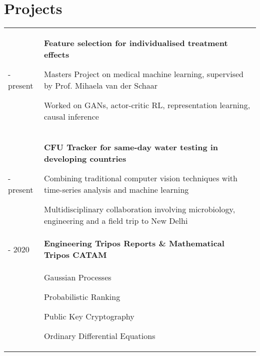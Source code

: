 \documentclass[letterpaper, 10pt]{article}
\begin{document}
\section*{Projects}
\begin{tabularx}{\linewidth}{>{\raggedleft}p{2.2cm}|X X}
2019 - present & \multicolumn{2}{p{\linegoal}}{
    \vspace{-2.9mm}\textbf{Feature selection for individualised treatment effects}
    \begin{compact}
        \item Masters Project on medical machine learning, supervised by Prof. Mihaela van der Schaar
        \item Worked on GANs, actor-critic RL, representation learning, causal inference
        \vspace{-.5\baselineskip}
    \end{compact}
}\\
2017 - present & \multicolumn{2}{p{\linegoal}}{
	\vspace{-2.9mm}\textbf{CFU Tracker for same-day water testing in developing countries}
	\begin{compact}
		\item Combining traditional computer vision techniques with time-series analysis and machine learning
		\item Multidisciplinary collaboration involving microbiology, engineering and a field trip to New Delhi
		\vspace{-.5\baselineskip}
	\end{compact}
}\\
2016 - 2020 & \multicolumn{2}{l}{\textbf{Engineering Tripos Reports \& Mathematical Tripos CATAM}}\\&
\begin{compact}
	\vspace{-.5\baselineskip}
    \item Gaussian Processes
    \item Probabilistic Ranking
    \item Public Key Cryptography
    \item Ordinary Differential Equations

\end{compact}
\end{tabularx}
\end{document}
